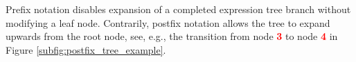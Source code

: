 \documentclass[runningheads]{llncs}
\begin{document}
\par Prefix notation disables expansion of a completed expression tree branch without modifying a leaf node. Contrarily, postfix notation allows the tree to expand upwards from the root node, see, e.g., the transition from node \textbf{\textcolor{red}{3}} to node \textbf{\textcolor{red}{4}} in Figure \ref{subfig:postfix_tree_example}.

\end{document}
